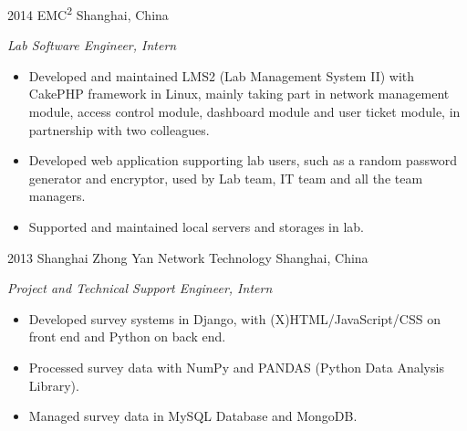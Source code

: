 \documentclass[]{friggeri-cv} %
\begin{document}
\begin{entrylist}
\entry
{2014}
{EMC\textsuperscript{2}}
{Shanghai, China}
{\emph{Lab Software Engineer, Intern}
\begin{itemize}
\item Developed and maintained LMS2 (Lab Management System II) with CakePHP framework in Linux, mainly taking part in network management module, access control module, dashboard module and user ticket module, in partnership with two colleagues.
\item Developed web application supporting lab users, such as a random password generator and encryptor, used by Lab team, IT team and all the team managers.
\item Supported and maintained local servers and storages in lab.
\end{itemize}
}
\entry
{2013}
{Shanghai Zhong Yan Network Technology}
{Shanghai, China}
{\emph{Project and Technical Support Engineer, Intern}
\begin{itemize}
\item Developed survey systems in Django, with (X)HTML/JavaScript/CSS on front end and Python on back end.
\item Processed survey data with NumPy and PANDAS (Python Data Analysis Library).
\item Managed survey data in MySQL Database and MongoDB.
\end{itemize}
}
\end{entrylist}


%
\end{document}
